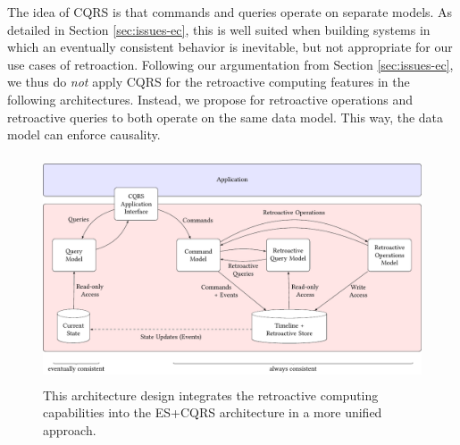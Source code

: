 The idea of CQRS is that commands and queries operate on separate models. As
detailed in Section \ref{sec:issues-ec}, this is well suited when building 
systems in which an eventually consistent behavior is inevitable, but not 
appropriate for our use cases of retroaction. 
Following our argumentation from Section \ref{sec:issues-ec}, we thus do 
\emph{not} apply CQRS for the retroactive computing features in the following 
architectures. Instead, we propose for retroactive operations and retroactive 
queries to both operate on the same data model. This way, the data model can 
enforce causality.

\begin{figure}[t]
	\centering
	\includegraphics[height=6.7cm]{../illustrations/cqrs-focus-embedded2.pdf}
	\caption{
		This architecture design integrates the retroactive computing 
		capabilities into the ES+CQRS architecture in a more unified 
		approach. 
	}
	\label{fig:embedded}
\end{figure}

